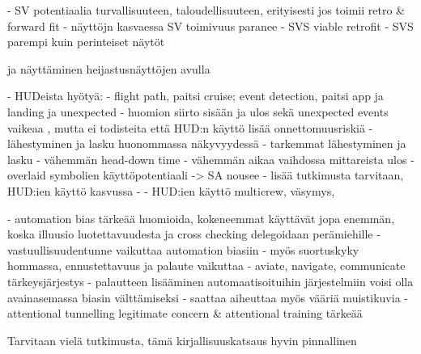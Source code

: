 \documentclass[utf8,bachelor,manualbib]{gradu3}
\begin{document}
- SV potentiaalia turvallisuuteen, taloudellisuuteen, erityisesti jos toimii retro \& forward fit
- näyttöjn kasvaessa SV toimivuus paranee
- SVS viable retrofit \citep{prinzel2004}
- SVS parempi kuin perinteiset näytöt \citep{schnellym2004}

 ja näyttäminen heijastusnäyttöjen avulla 
 
 - HUDeista hyötyä:
 	- flight path, paitsi cruise; event detection, paitsi app ja landing ja unexpected
 	- huomion siirto sisään ja ulos sekä unexpected events vaikeaa , mutta ei todisteita että HUD:n käyttö lisää onnettomuusriskiä
 	- lähestyminen ja lasku huonommassa näkyvyydessä
 	- tarkemmat lähestyminen ja lasku
 	- vähemmän head-down time
 	- vähemmän aikaa vaihdossa mittareista ulos
 	- overlaid symbolien käyttöpotentiaali -> SA nousee
 	- lisää tutkimusta tarvitaan, HUD:ien käyttö kasvussa
 	-  \citep{crawfordneal2006}
- HUD:ien käyttö multicrew, väsymys, \citep{crawfordneal2006}



- automation bias tärkeää huomioida, kokeneemmat käyttävät jopa enemmän, koska illuusio luotettavuudesta ja cross checking delegoidaan perämiehille
- vastuullisuudentunne vaikuttaa automation biasiin \citep{mosierym1998}
- myös suortuskyky hommassa, ennustettavuus ja palaute vaikuttaa
- aviate, navigate, communicate tärkeysjärjestys
- palautteen lisääminen automaatisoituihin järjestelmiin voisi olla avainasemassa biasin välttämiseksi
- saattaa aiheuttaa myös vääriä muistikuvia  \citep{mosierym1998}
- attentional tunnelling legitimate concern \& attentional training tärkeää \citep{wickensalexander2009}


Tarvitaan vielä tutkimusta, tämä kirjallisuuskatsaus hyvin pinnallinen

\end{document}
